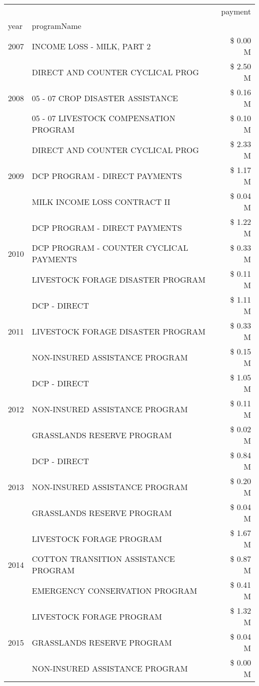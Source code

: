 \begin{tabular}{llr}
\toprule
 &  & payment \\
year & programName &  \\
\midrule
2007 & INCOME LOSS - MILK, PART 2 & \$ 0.00 M \\
\cline{1-3}
\multirow[t]{3}{*}{2008} & DIRECT AND COUNTER CYCLICAL PROG & \$ 2.50 M \\
 & 05 - 07 CROP DISASTER ASSISTANCE & \$ 0.16 M \\
 & 05 - 07 LIVESTOCK COMPENSATION PROGRAM & \$ 0.10 M \\
\cline{1-3}
\multirow[t]{3}{*}{2009} & DIRECT AND COUNTER CYCLICAL PROG & \$ 2.33 M \\
 & DCP PROGRAM - DIRECT PAYMENTS & \$ 1.17 M \\
 & MILK INCOME LOSS CONTRACT II & \$ 0.04 M \\
\cline{1-3}
\multirow[t]{3}{*}{2010} & DCP PROGRAM - DIRECT PAYMENTS & \$ 1.22 M \\
 & DCP PROGRAM - COUNTER CYCLICAL PAYMENTS & \$ 0.33 M \\
 & LIVESTOCK FORAGE DISASTER  PROGRAM & \$ 0.11 M \\
\cline{1-3}
\multirow[t]{3}{*}{2011} & DCP - DIRECT & \$ 1.11 M \\
 & LIVESTOCK FORAGE DISASTER PROGRAM & \$ 0.33 M \\
 & NON-INSURED ASSISTANCE PROGRAM & \$ 0.15 M \\
\cline{1-3}
\multirow[t]{3}{*}{2012} & DCP - DIRECT & \$ 1.05 M \\
 & NON-INSURED ASSISTANCE PROGRAM & \$ 0.11 M \\
 & GRASSLANDS RESERVE PROGRAM & \$ 0.02 M \\
\cline{1-3}
\multirow[t]{3}{*}{2013} & DCP - DIRECT & \$ 0.84 M \\
 & NON-INSURED ASSISTANCE PROGRAM & \$ 0.20 M \\
 & GRASSLANDS RESERVE PROGRAM & \$ 0.04 M \\
\cline{1-3}
\multirow[t]{3}{*}{2014} & LIVESTOCK FORAGE PROGRAM & \$ 1.67 M \\
 & COTTON TRANSITION ASSISTANCE PROGRAM & \$ 0.87 M \\
 & EMERGENCY CONSERVATION PROGRAM & \$ 0.41 M \\
\cline{1-3}
\multirow[t]{3}{*}{2015} & LIVESTOCK FORAGE PROGRAM & \$ 1.32 M \\
 & GRASSLANDS RESERVE PROGRAM & \$ 0.04 M \\
 & NON-INSURED ASSISTANCE PROGRAM & \$ 0.00 M \\

\end{tabular}

